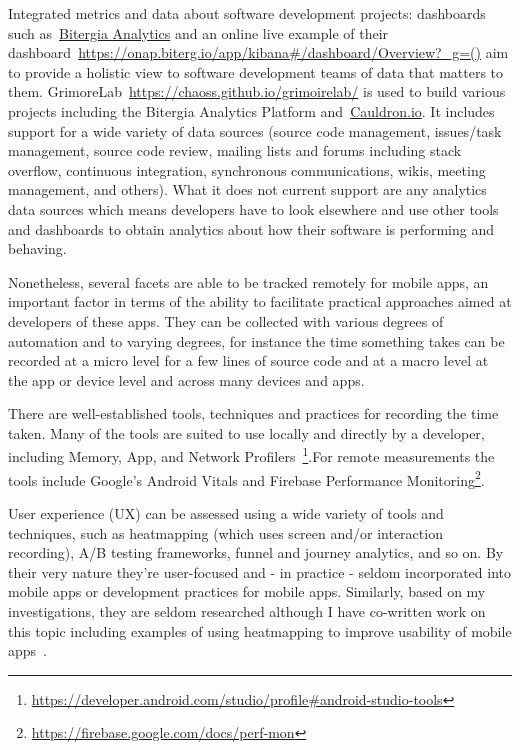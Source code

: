 Integrated metrics and data about software development projects: dashboards such as~\href{https://bitergia.com/bitergia-analytics/}{Bitergia Analytics} and an online live example of their dashboard~\url{https://onap.biterg.io/app/kibana#/dashboard/Overview?_g=()} aim to provide a holistic view to software development teams of data that matters to them. 
GrimoreLab~\url{https://chaoss.github.io/grimoirelab/} is used to build various projects including the Bitergia Analytics Platform and~\href{https://cauldron.io/dashboard/1640}{Cauldron.io}. It includes support for a wide variety of data sources (source code management, issues/task management, source code review, mailing lists and forums including stack overflow, continuous integration, synchronous communications, wikis, meeting management, and others). What it does not current support are any analytics data sources which means developers have to look elsewhere and use other tools and dashboards to obtain analytics about how their software is performing and behaving. 


Nonetheless, several facets are able to be tracked remotely for mobile apps, an important factor in terms of the ability to facilitate practical approaches aimed at developers of these apps. They can be collected with various degrees of automation and to varying degrees, for instance the time something takes can be recorded at a micro level for a few lines of source code and at a macro level at the app or device level and across many devices and apps. 

There are well-established tools, techniques and practices for recording the time taken. Many of the tools are suited to use locally and directly by a developer, including Memory, App, and Network Profilers~\footnote{\url{https://developer.android.com/studio/profile\#android-studio-tools}}.For remote measurements the tools include Google's Android Vitals and Firebase Performance Monitoring\footnote{\url{https://firebase.google.com/docs/perf-mon}}.

User experience (UX) can be assessed using a wide variety of tools and techniques, such as heatmapping (which uses screen and/or interaction recording), A/B testing frameworks, funnel and journey analytics, and so on. By their very nature they're user-focused and - in practice - seldom incorporated into mobile apps or development practices for mobile apps. Similarly, based on my investigations, they are seldom researched although I have co-written work on this topic including examples of using heatmapping to improve usability of mobile apps~\cite{harty_aymer_playbook_2016}.

